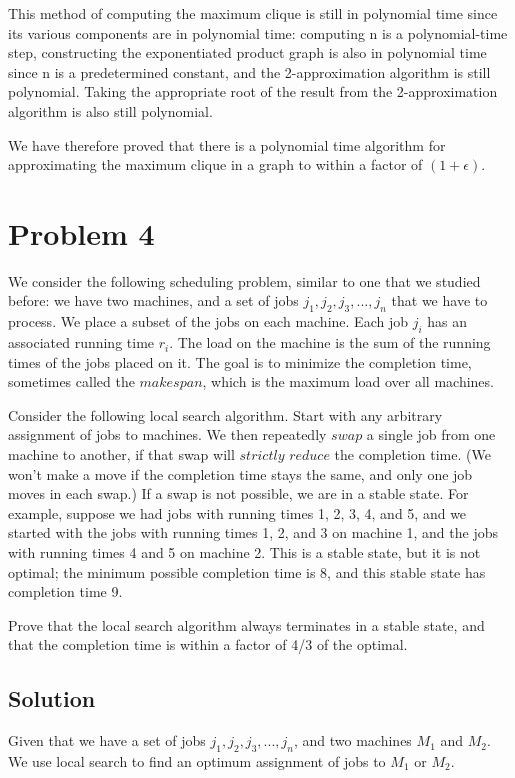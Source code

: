 \documentclass[11pt]{article}
\begin{document}
This method of computing the maximum clique is still in polynomial time since its various components are in polynomial time: computing n is a polynomial-time step, constructing the exponentiated product graph is also in polynomial time since n is a predetermined constant, and the 2-approximation algorithm is still polynomial. Taking the appropriate root of the result from the 2-approximation algorithm is also still polynomial. 

We have therefore proved that there is a polynomial time algorithm for approximating the maximum clique in a graph to within a factor of $(1 + \epsilon)$.
\section{Problem 4}

We consider the following scheduling problem, similar to one that we studied before: we have two machines, and a set of jobs $j_1, j_2, j_3,..., j_n$ that we have to process. We place a subset of the jobs on each machine. Each job $j_i$ has an associated running time $r_i$. The load on the machine is the sum of the running times of the jobs placed on it. The goal is to minimize the completion time, sometimes called the $makespan$, which is the maximum load over all machines.

Consider the following local search algorithm. Start with any arbitrary assignment of jobs to machines. We then repeatedly $swap$ a single job from one machine to another, if that swap will $strictly$ $reduce$ the completion time. (We won't make a move if the completion time stays the same, and only one job moves in each swap.) If a swap is not possible, we are in a stable state. For example, suppose we had jobs with running times 1, 2, 3, 4, and 5, and we started with the jobs with running times 1, 2, and 3 on machine 1, and the jobs with running times 4 and 5 on machine 2. This is a stable state, but it is not optimal; the minimum possible completion time is 8, and this stable state has completion time 9.

Prove that the local search algorithm always terminates in a stable state, and that the completion time is within a factor of 4/3 of the optimal.

\subsection{Solution}
Given that we have a set of jobs $j_1, j_2, j_3,..., j_n$, and two machines $M_1$ and $M_2$. We use local search to find an optimum assignment of jobs to $M_1$ or $M_2$. 
	
\end{document}
